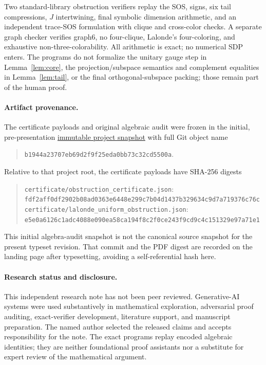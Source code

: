 \documentclass[11pt]{article}
\begin{document}
Two standard-library obstruction verifiers replay the SOS, signs, six tail
compressions, $J$ intertwining, final symbolic dimension arithmetic, and an
independent trace-SOS formulation with clique and cross-color checks.  A separate graph checker
verifies graph6, no four-clique, Lalonde's four-coloring, and exhaustive
non-three-colorability.  All arithmetic is exact; no numerical SDP enters.
The programs do not formalize the unitary gauge step in
Lemma~\ref{lem:core}, the projection/subspace semantics and complement
equalities in Lemma~\ref{lem:tail}, or the final orthogonal-subspace packing;
those remain part of the human proof.

\paragraph{Artifact provenance.}
The certificate payloads and original algebraic audit were frozen in the
initial, pre-presentation
\href{https://github.com/AlecKriebel/Math/tree/b1944a23707eb69d2f9f25eda0bb73c32cd5500a/lalonde20_quantum_coloring}{immutable project snapshot} with full Git object name
\begin{quote}\small
\nolinkurl{b1944a23707eb69d2f9f25eda0bb73c32cd5500a}.
\end{quote}
Relative to that project root, the certificate payloads have SHA-256 digests
\begin{quote}\footnotesize
\nolinkurl{certificate/obstruction_certificate.json}:\\[-0.2ex]
\nolinkurl{fdf2aff0df2902b08ad0363e6448e299c7b04d1437b329634c9d7a719376c76c}\\
\nolinkurl{certificate/lalonde_uniform_obstruction.json}:\\[-0.2ex]
\nolinkurl{e5e0a6126c1adc4088e090ea58ca194f8c2f0ce243f9cd9c4c151329e97a71e1}
\end{quote}
This initial algebra-audit snapshot is not the canonical source snapshot for
the present typeset revision.  That commit and the PDF digest are recorded on
the landing page after typesetting, avoiding a self-referential hash here.

\paragraph{Research status and disclosure.}
This independent research note has not been peer reviewed.  Generative-AI
systems were used substantively in mathematical exploration, adversarial proof
auditing, exact-verifier development, literature support, and manuscript
preparation.  The named author selected the released claims and accepts
responsibility for the note.  The exact programs replay encoded algebraic
identities; they are neither foundational proof assistants nor a substitute
for expert review of the mathematical argument.
\end{document}
